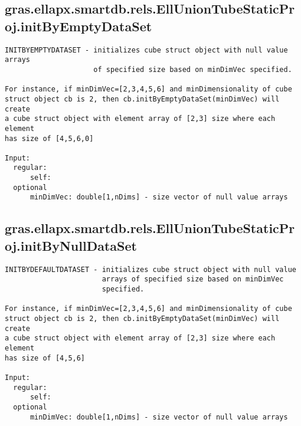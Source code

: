 \subsection{\texorpdfstring{gras.ellapx.smartdb.rels.EllUnionTubeStaticProj.initByEmptyDataSet}{initByEmptyDataSet}}\label{method:gras.ellapx.smartdb.rels.EllUnionTubeStaticProj.initByEmptyDataSet}
\begin{verbatim}
INITBYEMPTYDATASET - initializes cube struct object with null value arrays
                     of specified size based on minDimVec specified.

For instance, if minDimVec=[2,3,4,5,6] and minDimensionality of cube
struct object cb is 2, then cb.initByEmptyDataSet(minDimVec) will create
a cube struct object with element array of [2,3] size where each element
has size of [4,5,6,0]

Input:
  regular:
      self:
  optional
      minDimVec: double[1,nDims] - size vector of null value arrays
\end{verbatim}
\subsection{\texorpdfstring{gras.ellapx.smartdb.rels.EllUnionTubeStaticProj.initByNullDataSet}{initByNullDataSet}}\label{method:gras.ellapx.smartdb.rels.EllUnionTubeStaticProj.initByNullDataSet}
\begin{verbatim}
INITBYDEFAULTDATASET - initializes cube struct object with null value
                       arrays of specified size based on minDimVec
                       specified.

For instance, if minDimVec=[2,3,4,5,6] and minDimensionality of cube
struct object cb is 2, then cb.initByEmptyDataSet(minDimVec) will create
a cube struct object with element array of [2,3] size where each element
has size of [4,5,6]

Input:
  regular:
      self:
  optional
      minDimVec: double[1,nDims] - size vector of null value arrays
\end{verbatim}

